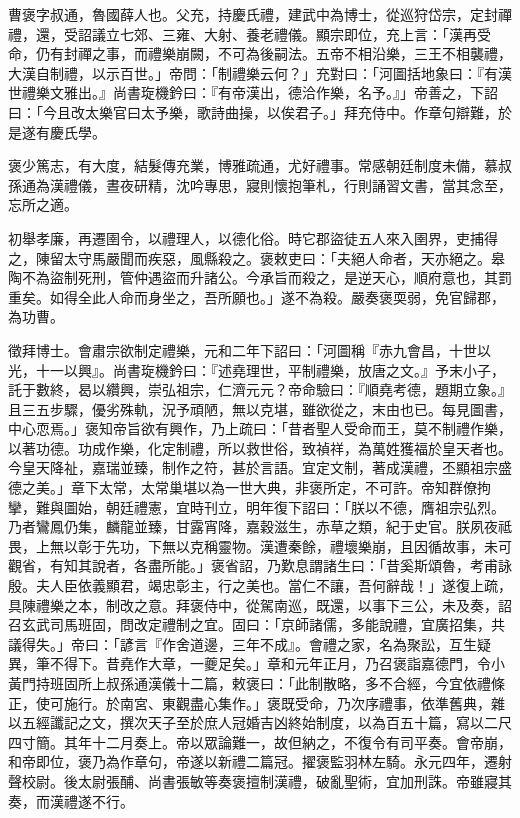 \begin{pinyinscope}
曹褒字叔通，魯國薛人也。父充，持慶氏禮，建武中為博士，從巡狩岱宗，定封禪禮，還，受詔議立七郊、三雍、大射、養老禮儀。顯宗即位，充上言：「漢再受命，仍有封禪之事，而禮樂崩闕，不可為後嗣法。五帝不相沿樂，三王不相襲禮，大漢自制禮，以示百世。」帝問：「制禮樂云何？」充對曰：「河圖括地象曰：『有漢世禮樂文雅出。』尚書琁機鈐曰：『有帝漢出，德洽作樂，名予。』」帝善之，下詔曰：「今且改太樂官曰太予樂，歌詩曲操，以俟君子。」拜充侍中。作章句辯難，於是遂有慶氏學。

褒少篤志，有大度，結髮傳充業，博雅疏通，尤好禮事。常感朝廷制度未備，慕叔孫通為漢禮儀，晝夜研精，沈吟專思，寢則懷抱筆札，行則誦習文書，當其念至，忘所之適。

初舉孝廉，再遷圉令，以禮理人，以德化俗。時它郡盜徒五人來入圉界，吏捕得之，陳留太守馬嚴聞而疾惡，風縣殺之。褒敕吏曰：「夫絕人命者，天亦絕之。皋陶不為盜制死刑，管仲遇盜而升諸公。今承旨而殺之，是逆天心，順府意也，其罰重矣。如得全此人命而身坐之，吾所願也。」遂不為殺。嚴奏褒耎弱，免官歸郡，為功曹。

徵拜博士。會肅宗欲制定禮樂，元和二年下詔曰：「河圖稱『赤九會昌，十世以光，十一以興』。尚書琁機鈐曰：『述堯理世，平制禮樂，放唐之文。』予末小子，託于數終，曷以纘興，崇弘祖宗，仁濟元元？帝命驗曰：『順堯考德，題期立象。』且三五步驟，優劣殊軌，況予頑陋，無以克堪，雖欲從之，末由也已。每見圖書，中心恧焉。」褒知帝旨欲有興作，乃上疏曰：「昔者聖人受命而王，莫不制禮作樂，以著功德。功成作樂，化定制禮，所以救世俗，致禎祥，為萬姓獲福於皇天者也。今皇天降祉，嘉瑞並臻，制作之符，甚於言語。宜定文制，著成漢禮，丕顯祖宗盛德之美。」章下太常，太常巢堪以為一世大典，非褒所定，不可許。帝知群僚拘攣，難與圖始，朝廷禮憲，宜時刊立，明年復下詔曰：「朕以不德，膺祖宗弘烈。乃者鸞鳳仍集，麟龍並臻，甘露宵降，嘉穀滋生，赤草之類，紀于史官。朕夙夜祗畏，上無以彰于先功，下無以克稱靈物。漢遭秦餘，禮壞樂崩，且因循故事，未可觀省，有知其說者，各盡所能。」褒省詔，乃歎息謂諸生曰：「昔奚斯頌魯，考甫詠殷。夫人臣依義顯君，竭忠彰主，行之美也。當仁不讓，吾何辭哉！」遂復上疏，具陳禮樂之本，制改之意。拜褒侍中，從駕南巡，既還，以事下三公，未及奏，詔召玄武司馬班固，問改定禮制之宜。固曰：「京師諸儒，多能說禮，宜廣招集，共議得失。」帝曰：「諺言『作舍道邊，三年不成』。會禮之家，名為聚訟，互生疑異，筆不得下。昔堯作大章，一夔足矣。」章和元年正月，乃召褒詣嘉德門，令小黃門持班固所上叔孫通漢儀十二篇，敕褒曰：「此制散略，多不合經，今宜依禮條正，使可施行。於南宮、東觀盡心集作。」褒既受命，乃次序禮事，依準舊典，雜以五經讖記之文，撰次天子至於庶人冠婚吉凶終始制度，以為百五十篇，寫以二尺四寸簡。其年十二月奏上。帝以眾論難一，故但納之，不復令有司平奏。會帝崩，和帝即位，褒乃為作章句，帝遂以新禮二篇冠。擢褒監羽林左騎。永元四年，遷射聲校尉。後太尉張酺、尚書張敏等奏褒擅制漢禮，破亂聖術，宜加刑誅。帝雖寢其奏，而漢禮遂不行。


\end{pinyinscope}
